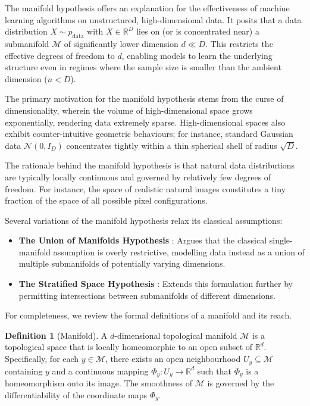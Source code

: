 \documentclass{article}
\theoremstyle{plain}
\theoremstyle{definition}
\newtheorem{definition}[theorem]{Definition}
\theoremstyle{remark}
\begin{document}
The manifold hypothesis offers an explanation for the effectiveness of machine learning algorithms on unstructured, high-dimensional data. It posits that a data distribution $X \sim p_\text{data}$ with $X \in \mathbb{R}^D$ lies on (or is concentrated near) a submanifold $\mathcal{M}$ of significantly lower dimension $d \ll D$. This restricts the effective degrees of freedom to $d$, enabling models to learn the underlying structure even in regimes where the sample size is smaller than the ambient dimension ($n < D$).

The primary motivation for the manifold hypothesis stems from the curse of dimensionality, wherein the volume of high-dimensional space grows exponentially, rendering data extremely sparse. High-dimensional spaces also exhibit counter-intuitive geometric behaviours; for instance, standard Gaussian data $\mathcal{N}(0, I_D)$ concentrates tightly within a thin spherical shell of radius $\sqrt{D}$.

The rationale behind the manifold hypothesis is that natural data distributions are typically locally continuous and governed by relatively few degrees of freedom. For instance, the space of realistic natural images constitutes a tiny fraction of the space of all possible pixel configurations.

Several variations of the manifold hypothesis relax its classical assumptions:
\begin{itemize}
    \item \textbf{The Union of Manifolds Hypothesis} \citep{brown2022union, brown2022verifying}: Argues that the classical single-manifold assumption is overly restrictive, modelling data instead as a union of multiple submanifolds of potentially varying dimensions.
    \item \textbf{The Stratified Space Hypothesis} \citep{aamari2024theory}: Extends this formulation further by permitting intersections between submanifolds of different dimensions.
\end{itemize}

For completeness, we review the formal definitions of a manifold and its reach.

\begin{definition}[Manifold]
A $d$-dimensional topological manifold $\mathcal{M}$ is a topological space that is locally homeomorphic to an open subset of $\mathbb{R}^d$. Specifically, for each $y \in \mathcal{M}$, there exists an open neighbourhood $U_y \subseteq \mathcal{M}$ containing $y$ and a continuous mapping $\Phi_y: U_y \rightarrow \mathbb{R}^d$ such that $\Phi_y$ is a homeomorphism onto its image. The smoothness of $\mathcal{M}$ is governed by the differentiability of the coordinate maps $\Phi_y$.
\end{definition}
\end{document}
